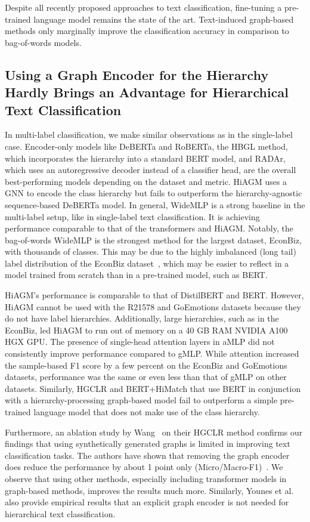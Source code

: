 \documentclass[acmsmall,nonacm]{acmart}
\newcommand{\mlp}{WideMLP\xspace}
\begin{document}
Despite all recently proposed approaches to text classification, fine-tuning a pre-trained language model remains the state of the art. 
Text-induced graph-based methods only marginally improve the classification accuracy in comparison to bag-of-words models.

\subsection{Using a Graph Encoder for the Hierarchy Hardly Brings an Advantage for Hierarchical Text Classification}
In multi-label classification, we make similar observations as in the single-label case.
Encoder-only models like DeBERTa and RoBERTa, the HBGL method, which incorporates the hierarchy into a standard BERT model, and RADAr, which uses an autoregressive decoder instead of a classifier head, are the overall best-performing models depending on the dataset and metric. 
HiAGM uses a GNN to encode the class hierarchy but fails to outperform the hierarchy-agnostic sequence-based DeBERTa model.
In general, \mlp is a strong baseline in the multi-label setup, like in single-label text classification.
It is achieving performance comparable to that of the transformers and HiAGM.
Notably, the bag-of-words \mlp is the strongest method for the largest dataset, EconBiz, with thousands of classes.
This may be due to the highly imbalanced (long tail) label distribution of the EconBiz dataset~\cite{DBLP:conf/jcdl/MaiGS18}, which may be easier to reflect in a model trained from scratch than in a pre-trained model, such as BERT.

HiAGM's performance is comparable to that of DistilBERT and BERT. However, HiAGM cannot be used with the R21578 and GoEmotions datasets because they do not have label hierarchies. 
Additionally, large hierarchies, such as in the EconBiz, led HiAGM to run out of memory on a 40 GB RAM NVIDIA A100 HGX GPU.
The presence of single-head attention layers in aMLP did not consistently improve performance compared to gMLP. 
While attention increased the sample-based F1 score by a few percent on the EconBiz and GoEmotions datasets, performance was the same or even less than that of gMLP on other datasets.
Similarly, HGCLR and BERT+HiMatch that use BERT in conjunction with a hierarchy-processing graph-based model fail to outperform a simple pre-trained language model that does not make use of the class hierarchy.

Furthermore, an ablation study by
Wang~\etal\cite{DBLP:conf/acl/WangWH0W22} on their HGCLR method confirms our findings
that using synthetically generated graphs is limited in improving text
classification tasks.  The authors have shown that removing the graph encoder
does reduce the performance by about 1 point only
(Micro/Macro-F1)~\cite{DBLP:conf/acl/WangWH0W22}.  We observe that using other methods, especially including transformer models in graph-based methods, improves the results much more. 
Similarly, Younes et al.~\cite{radar} also provide empirical results that an explicit graph encoder is not needed for hierarchical text classification.
\end{document}
